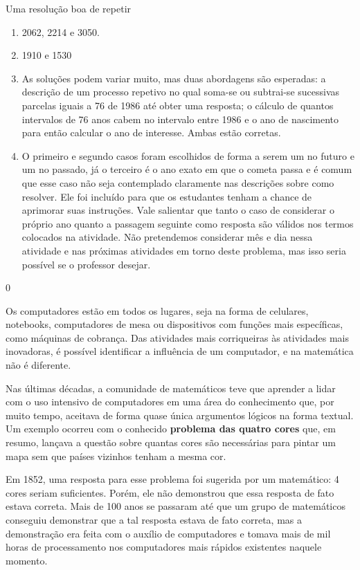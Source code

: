 \begin{answer}{Uma resolução boa de repetir}
{
\begin{enumerate}
\item 2062, 2214 e 3050.

\item 1910 e 1530

\item As soluções podem variar muito, mas duas abordagens são esperadas: a descrição de um processo repetivo no qual soma-se ou subtrai-se sucessivas parcelas iguais a 76 de 1986 até obter uma resposta; o cálculo de quantos intervalos de 76 anos cabem no intervalo entre 1986 e o ano de nascimento para então calcular o ano de interesse. Ambas estão corretas.

\item O primeiro e segundo casos foram escolhidos de forma a serem um no futuro e um no passado, já o terceiro é o ano exato em que o cometa passa e é comum que esse caso não seja contemplado claramente nas descrições sobre como resolver. Ele foi incluído para que os estudantes tenham a chance de aprimorar suas instruções. Vale salientar que tanto o caso de considerar o próprio ano quanto a passagem seguinte como resposta são válidos nos termos colocados na atividade. Não pretendemos considerar mês e dia nessa atividade e nas próximas atividades em torno deste problema, mas isso seria possível se o professor desejar.
\end{enumerate}
}{0}
\end{answer}

\label{comp-exp1}

Os computadores estão em todos os lugares, seja na forma de celulares, notebooks, computadores de mesa ou dispositivos com funções mais específicas, como máquinas de cobrança. Das atividades mais corriqueiras às atividades mais inovadoras, é possível identificar a influência de um computador, e na matemática não é diferente.

Nas últimas décadas, a comunidade de matemáticos teve que aprender a lidar com o uso intensivo de computadores em uma área do conhecimento que, por muito tempo, aceitava de forma quase única argumentos lógicos na forma textual. Um exemplo ocorreu com o conhecido \textbf{problema das quatro cores} que, em resumo, lançava a questão sobre quantas cores são necessárias para pintar um mapa sem que países vizinhos tenham a mesma cor.

Em 1852, uma resposta para esse problema foi sugerida por um matemático: 4 cores seriam suficientes. Porém, ele não demonstrou que essa resposta de fato estava correta. Mais de 100 anos se passaram até que um grupo de matemáticos conseguiu demonstrar que a tal resposta estava de fato correta, mas a demonstração era feita com o auxílio de computadores e tomava mais de mil horas de processamento nos computadores mais rápidos existentes naquele momento.

